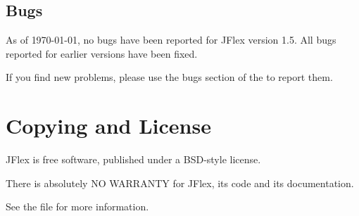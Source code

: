 \documentclass[11pt]{scrartcl}
\newcommand{\ver}{1.5}
\begin{document}
\subsection{Bugs}
As of {\today}, no bugs have been reported for JFlex version \ver. All 
bugs reported for earlier versions have been fixed.

If you find new problems, please use the bugs section of the
to report them.
 
 
\section{Copying and License\label{Copyright}}
JFlex is free software, published under a BSD-style license.

There is absolutely NO WARRANTY for JFlex, its code and its documentation.

See the file  for more information.  
\end{document}
